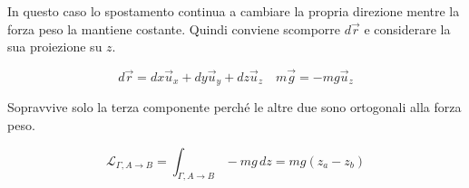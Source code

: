 In questo caso lo spostamento continua a cambiare la propria direzione mentre la forza peso la mantiene costante. Quindi conviene scomporre $d\vec{r}$ e considerare la sua proiezione su $z$.

\[
	d\vec{r}=dx\vec{u}_x+dy\vec{u}_y+dz\vec{u}_z \quad m\vec{g}=-mg\vec{u}_z
\]

Sopravvive solo la terza componente perché le altre due sono ortogonali alla forza peso.

\[
	\boxed{\mathcal{L}_{\Gamma, A \to B}=\int_{\Gamma, A \to B} -mg\,dz=mg(z_a-z_b)}
\]

\begin{figure}[htpb]
	\centering


	\begin{tikzpicture}[x=0.75pt,y=0.75pt,yscale=-1,xscale=1]


\end{tikzpicture}
\end{figure}
